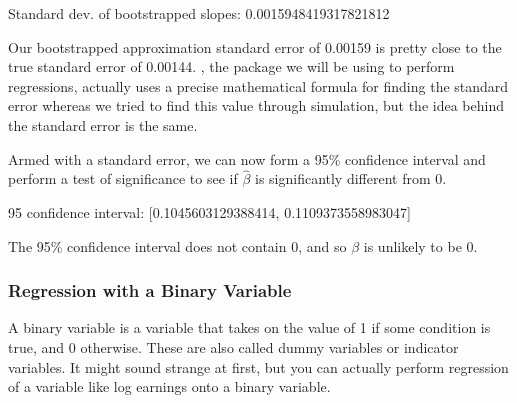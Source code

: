 \documentclass[letterpaper,10pt,english]{jupyterBook}
\begin{document}
\begin{sphinxVerbatim}[commandchars=\\\{\}]
Standard dev. of bootstrapped slopes:  0.0015948419317821812
\end{sphinxVerbatim}

\noindent{}

\sphinxAtStartPar
Our bootstrapped approximation standard error of 0.00159 is pretty close to the true standard error of 0.00144. , the package we will be using to perform regressions, actually uses a precise mathematical formula for finding the standard error whereas we tried to find this value through simulation, but the idea behind the standard error is the same.

\sphinxAtStartPar
Armed with a standard error, we can now form a 95\% confidence interval and perform a test of significance to see if \(\hat{\beta}\) is significantly different from 0.

\begin{sphinxVerbatim}[commandchars=\\\{\}]
   
   
\PYG{l+s+s1}{onfidence interval: [}\PYG{l+s+s1}{]} 
\end{sphinxVerbatim}

\begin{sphinxVerbatim}[commandchars=\\\{\}]
95\PYGZpc{} confidence interval: [0.1045603129388414, 0.1109373558983047]
\end{sphinxVerbatim}

\sphinxAtStartPar
The 95\% confidence interval does not contain 0, and so \(\beta\) is unlikely to be 0.


\subsubsection{Regression with a Binary Variable}
\label{\detokenize{content/11-econometrics/single-variable:regression-with-a-binary-variable}}
\sphinxAtStartPar
A binary variable is a variable that takes on the value of 1 if some condition is true, and 0 otherwise. These are also called dummy variables or indicator variables. It might sound strange at first, but you can actually perform regression of a variable like log earnings onto a binary variable.
\end{document}
